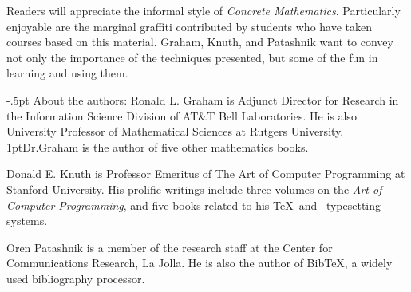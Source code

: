 Readers will appreciate the informal style of {\sl Concrete Mathematics}.
Particularly enjoyable are the marginal graffiti contributed by
students who have taken courses based on this material. Graham, Knuth,
and Patashnik want to convey not only the importance of the techniques
presented, but some of the fun in learning and using them.

\hsize=21.5pc

{\subsubtitle\kern-.5pt About the authors:}\hfill\break
{\sc Ronald L. Graham} is Adjunct Director for Research in the
Information Science Division of AT\&T Bell Laboratories. He is also
University Professor of Mathematical Sciences at Rutgers University.
\kern1ptDr.\thinspace Graham is the author of five other mathematics books.


{\sc Donald E. Knuth} is Professor Emeritus of The Art of Computer Programming
at Stanford University. His prolific writings include three volumes
on the {\sl Art of Computer Programming}, and five books related
to his \TeX\ and \MF\ typesetting systems.

\hsize=18pc
{\sc Oren Patashnik} is a member of the research staff at the Center for
Communications Research, La Jolla. He is also the author of Bib\-\TeX,
a widely used bibliography processor.


\eject
\bye
